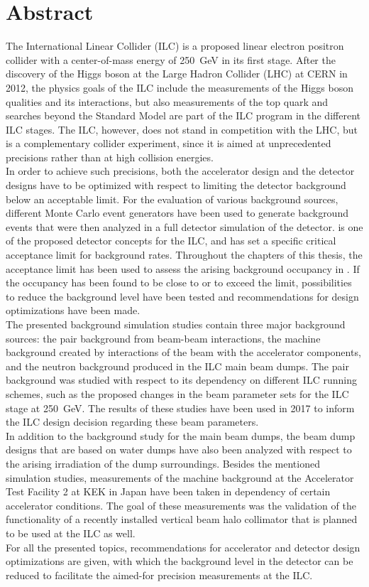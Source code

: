 \chapter*{Abstract}
The International Linear Collider (ILC) is a proposed linear electron positron collider with a center-of-mass energy of \SI{250}{\GeV} in its first stage.
After the discovery of the Higgs boson at the Large Hadron Collider (LHC) at CERN in 2012, the physics goals of the ILC include the measurements of the Higgs boson qualities and its interactions, but also measurements of the top quark and searches beyond the Standard Model are part of the ILC program in the different ILC stages.
The ILC, however, does not stand in competition with the LHC, but is a complementary collider experiment, since it is aimed at unprecedented precisions rather than at high collision energies.
\\In order to achieve such precisions, both the accelerator design and the detector designs have to be optimized with respect to limiting the detector background below an acceptable limit.
For the evaluation of various background sources, different Monte Carlo event generators have been used to generate background events that were then analyzed in a full detector simulation of the \sid detector.
\sid is one of the proposed detector concepts for the ILC, and has set a specific critical acceptance limit for background rates.
Throughout the chapters of this thesis, the acceptance limit has been used to assess the arising background occupancy in \sid.
If the occupancy has been found to be close to or to exceed the limit, possibilities to reduce the background level have been tested and recommendations for design optimizations have been made.
\\The presented background simulation studies contain three major background sources: the \positron\electron pair background from beam-beam interactions, the machine background created by interactions of the beam with the accelerator components, and the neutron background produced in the ILC main beam dumps.
The pair background was studied with respect to its dependency on different ILC running schemes, such as the proposed changes in the beam parameter sets for the ILC stage at \SI{250}{\GeV}.
The results of these studies have been used in 2017 to inform the ILC design decision regarding these beam parameters.
\\In addition to the background study for the main beam dumps, the beam dump designs that are based on water dumps have also been analyzed with respect to the arising irradiation of the dump surroundings.
Besides the mentioned simulation studies, measurements of the machine background at the Accelerator Test Facility 2 at KEK in Japan have been taken in dependency of certain accelerator conditions.
The goal of these measurements was the validation of the functionality of a recently installed vertical beam halo collimator that is planned to be used at the ILC as well.
\\For all the presented topics, recommendations for accelerator and detector design optimizations are given, with which the background level in the \sid detector can be reduced to facilitate the aimed-for precision measurements at the ILC.